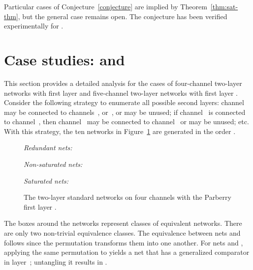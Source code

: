 \documentclass[10pt]{IEEEtran}
\begin{document}
{{Particular cases of Conjecture~\ref{conjecture} are implied by
Theorem~\ref{thm:sat-thm}, but the general case remains open. The
conjecture has been verified experimentally for .


\section{Case studies:  and }
\label{sec:example}

This section provides a detailed analysis for the cases of
four-channel two-layer networks with first layer  and
five-channel two-layer networks with first layer .
Consider the following strategy to enumerate all possible
second layers: channel  may be connected to channels~, 
or~, or may be unused; if channel~ is connected to channel~,
then channel~ may be connected to channel~ or may be unused;
etc.  With this strategy, the ten networks in Figure~\ref{fig:4wire} are generated in
the order .

\begin{figure}
\smallskip\emph{Redundant nets:}\smallskip


\smallskip\emph{Non-saturated nets:}\smallskip


\smallskip
{}

\smallskip\emph{Saturated nets:}\smallskip

\bigskip

\caption{The  two-layer standard networks on four channels with the Parberry first layer .}
\label{fig:4wire}
\end{figure}

The boxes around the networks represent classes of
equivalent networks.  There are only two non-trivial equivalence
classes.
The equivalence between nets  and  follows since
the permutation  transforms them into one another.  For
nets  and , applying the same permutation to  yields a net
that has a generalized comparator in layer~; untangling it results in
.

}}
\end{document}
